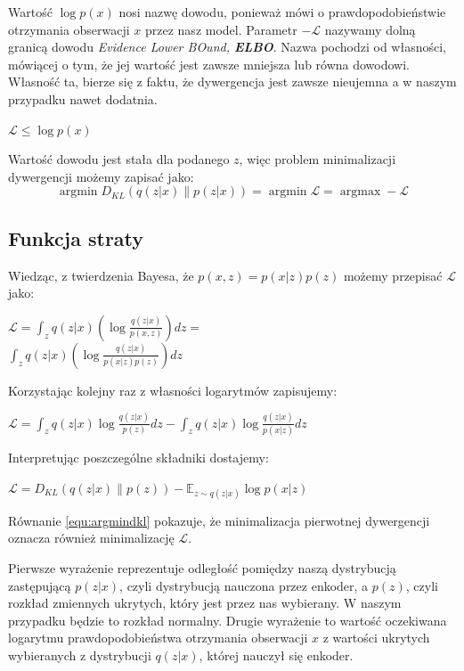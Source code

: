 \documentclass[a4paper,12pt]{book} %
\begin{document}
Wartość $\log p(x)$ nosi nazwę dowodu, ponieważ mówi o prawdopodobieństwie otrzymania obserwacji $x$ przez nasz model.
Parametr $-\mathcal{L}$ nazywamy dolną granicą dowodu \textit{Evidence Lower BOund, \textbf{ELBO}}. Nazwa pochodzi od własności, mówiącej o tym, że jej wartość jest zawsze mniejsza lub równa dowodowi. Własność ta, bierze się z faktu, że 
dywergencja jest zawsze nieujemna a w naszym przypadku nawet dodatnia. 
\begin{center}
	$\mathcal{L}\leq\log p(x)$
\end{center}
Wartość dowodu jest stała dla podanego $z$, więc problem minimalizacji dywergencji możemy zapisać jako:
\begin{equation}
	\operatorname*{argmin}D_{KL}(q(z|x)\|p(z|x)) = \operatorname*{argmin}\mathcal{L} = \operatorname*{argmax}-\mathcal{L}
	\label{equ:argmindkl}
\end{equation}
\subsection{Funkcja straty}
Wiedząc, z twierdzenia Bayesa, że $p(x,z) = p(x|z)p(z)$ możemy przepisać $\mathcal{L}$ jako:
\begin{center}
	$\mathcal{L}=\displaystyle\int_{z}^{}q(z|x)\left( \log\frac{q(z|x)}{p(x,z)}\right)dz=$\\
	$\displaystyle\int_{z}^{}q(z|x)\left( \log\frac{q(z|x)}{p(x|z)p(z)}\right)dz$
\end{center}
Korzystając kolejny raz z własności logarytmów zapisujemy:
\begin{center}
	$\mathcal{L}=\displaystyle\int_{z}^{}q(z|x)\log\frac{q(z|x)}{p(z)}dz - \displaystyle\int_{z}^{}q(z|x)\log\frac{q(z|x)}{p(x|z)}dz$
\end{center}
Interpretując poszczególne składniki dostajemy:
\begin{center}
	$\mathcal{L} =  D_{KL}(q(z|x)\|p(z)) - \mathbb{E}_{z\sim q(z|x)}\log p(x|z)$
\end{center}
Równanie \ref{equ:argmindkl} pokazuje, że minimalizacja pierwotnej dywergencji oznacza również minimalizację $\mathcal{L}$. 

Pierwsze wyrażenie reprezentuje odległość pomiędzy naszą dystrybucją zastępującą $p(z|x)$, czyli dystrybucją nauczona przez enkoder, a $p(z)$, czyli rozkład zmiennych ukrytych, który jest przez nas wybierany. W naszym przypadku będzie to rozkład normalny. Drugie wyrażenie to wartość oczekiwana logarytmu prawdopodobieństwa otrzymania obserwacji $x$ z wartości ukrytych wybieranych z dystrybucji $q(z|x)$, której nauczył się enkoder.
\end{document}
